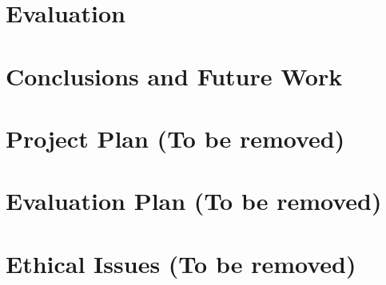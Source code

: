 \documentclass[12pt,twoside]{report}
\begin{document}
\chapter{Evaluation}



\chapter{Conclusions and Future Work}

\chapter{Project Plan (To be removed)}


\chapter{Evaluation Plan (To be removed)}


\chapter{Ethical Issues (To be removed)}


\printbibliography
\end{document}
